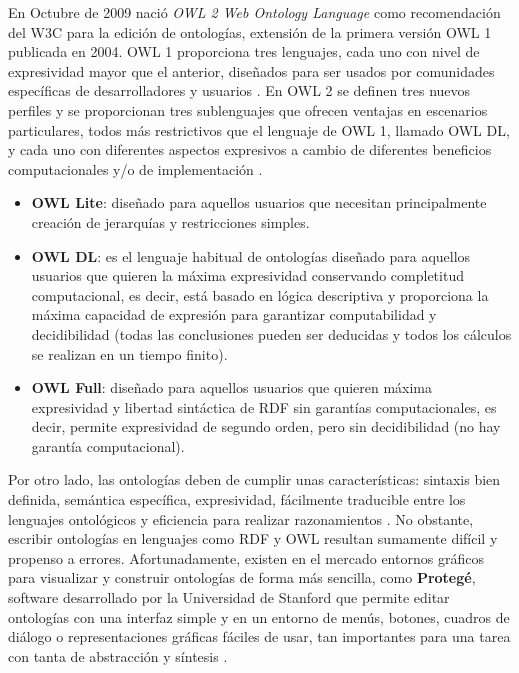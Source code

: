 En Octubre de 2009 nació \textit{OWL 2 Web Ontology Language} como recomendación del W3C para la edición de ontologías, extensión de la primera versión OWL 1 publicada en 2004. OWL 1 proporciona tres lenguajes, cada uno con nivel de expresividad mayor que el anterior, diseñados para ser usados por comunidades específicas de desarrolladores y usuarios \cite{owl-tipos}. En OWL 2 se definen tres nuevos perfiles y se proporcionan tres sublenguajes que ofrecen ventajas en escenarios particulares, todos más restrictivos que el lenguaje de OWL 1, llamado OWL DL, y cada uno con diferentes aspectos expresivos a cambio de diferentes beneficios computacionales y/o de implementación \cite{aplicacion}. 

\begin{itemize}
	\item \textbf{OWL Lite}: diseñado para aquellos usuarios que necesitan principalmente creación de jerarquías y restricciones simples.
	
	\item \textbf{OWL DL}: es el lenguaje habitual de ontologías diseñado para aquellos usuarios que quieren la máxima expresividad conservando completitud computacional, es decir, está basado en lógica descriptiva y proporciona la máxima capacidad de expresión para garantizar computabilidad y decidibilidad (todas las conclusiones pueden ser deducidas y todos los cálculos se realizan en un tiempo finito).
	
	\item \textbf{OWL Full}: diseñado para aquellos usuarios que quieren máxima expresividad y libertad sintáctica de RDF sin garantías computacionales, es decir, permite expresividad de segundo orden, pero sin decidibilidad (no hay garantía computacional).
\end{itemize}



Por otro lado, las ontologías deben de cumplir unas características: sintaxis bien definida, semántica específica, expresividad, fácilmente traducible entre los lenguajes ontológicos y eficiencia para realizar razonamientos \cite{apuntes-clase-jose}. No obstante, escribir ontologías en lenguajes como RDF y OWL resultan sumamente difícil y propenso a errores. Afortunadamente, existen en el mercado entornos gráficos para visualizar y construir ontologías de forma más sencilla, como \textbf{Protegé}, software desarrollado por la Universidad de Stanford que permite editar ontologías con una interfaz simple y en un entorno de menús, botones, cuadros de diálogo o representaciones gráficas fáciles de usar, tan importantes para una tarea con tanta de abstracción y síntesis \cite{protege}.

